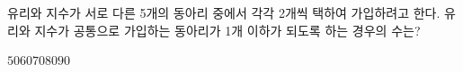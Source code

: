 \hspace*{2mm}\begin{minipage}[t]{\dimexpr\linewidth-2mm\relax}\vspace{0pt}
유리와 지수가 서로 다른 5개의 동아리 중에서 각각 2개씩 택하여 가입하려고 한다. 유리와 지수가 공통으로 가입하는 동아리가 1개 이하가 되도록 하는 경우의 수는? 
\begin{choices32}{$50$}{$60$}{$70$}{$80$}{$90$}\end{choices32}\end{minipage}
